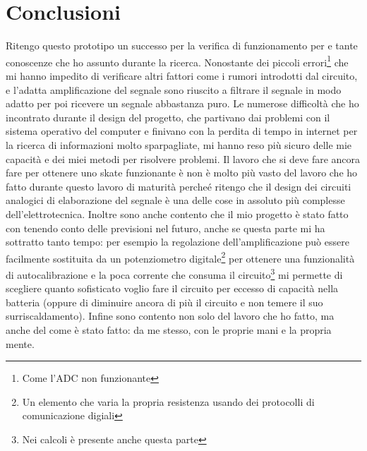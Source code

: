 \documentclass[a4paper, 10pt, final]{article} %
\begin{document}
    \section{Conclusioni}
    Ritengo questo prototipo un successo per la verifica di funzionamento per e tante conoscenze che ho assunto durante la ricerca.
    Nonostante dei piccoli errori\footnote{Come l'ADC non funzionante} che mi hanno impedito di verificare altri fattori come i rumori introdotti dal circuito, e l'adatta amplificazione del segnale sono riuscito a filtrare il segnale in modo adatto per poi ricevere un segnale abbastanza puro.
    Le numerose difficolt\`{a} che ho incontrato durante il design del progetto, che partivano dai problemi con il sistema operativo del computer e finivano con la perdita di tempo in internet per la ricerca di informazioni molto sparpagliate, mi hanno reso pi\`{u} sicuro delle mie capacit\`{a} e dei miei metodi per risolvere problemi.
    Il lavoro che si deve fare ancora fare per ottenere uno skate funzionante \`{e} non \`{e} molto pi\`{u} vasto del lavoro che ho fatto durante questo lavoro di maturit\`{a} perche\'{e} ritengo che il design dei circuiti analogici di elaborazione del segnale \`{e} una delle cose in assoluto pi\`{u} complesse dell'elettrotecnica.
    Inoltre sono anche contento che il mio progetto \`{e} stato fatto con tenendo conto delle previsioni nel futuro, anche se questa parte mi ha sottratto tanto tempo: per esempio la regolazione dell'amplificazione pu\`{o} essere facilmente sostituita da un potenziometro digitale\footnote{Un elemento che varia la propria resistenza usando dei protocolli di comunicazione digiali} per ottenere una funzionalit\`{a} di autocalibrazione e la poca corrente che consuma il circuito\footnote{Nei calcoli \`{e} presente anche questa parte} mi permette di scegliere quanto sofisticato voglio fare il circuito per eccesso di capacit\`{a} nella batteria (oppure di diminuire ancora di pi\`{u} il circuito e non temere il suo surriscaldamento).
    Infine sono contento non solo del lavoro che ho fatto, ma anche del come \`{e} stato fatto: da me stesso, con le proprie mani e la propria mente.
\end{document}
